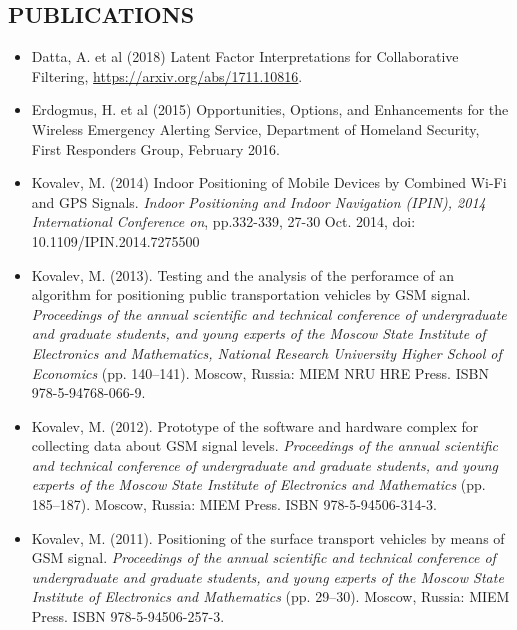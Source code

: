 \documentclass{res}
\begin{document}
\begin{resume}
\section{PUBLICATIONS}
\begin{itemize}
	\item
		Datta, A. et al (2018)  Latent Factor Interpretations for Collaborative Filtering, \url{https://arxiv.org/abs/1711.10816}.
	\item
		Erdogmus, H. et al (2015) Opportunities, Options, and Enhancements for the Wireless Emergency Alerting Service, Department of Homeland Security, First Responders Group, February 2016.  
	\item
		Kovalev, M. (2014) Indoor Positioning of Mobile Devices by Combined Wi-Fi and GPS Signals. \emph{Indoor Positioning and Indoor Navigation (IPIN), 2014 International Conference on}, pp.332-339, 27-30 Oct. 2014, doi: 10.1109/IPIN.2014.7275500
	\item
		Kovalev, M. (2013). Testing and the analysis of the perforamce of an algorithm for positioning public transportation vehicles by GSM signal. \emph{Proceedings of the annual scientific and technical conference of undergraduate and graduate students, and young experts of the Moscow State Institute of Electronics and Mathematics, National Research University Higher School of Economics} (pp. 140--141). Moscow, Russia: MIEM NRU HRE Press. ISBN 978-5-94768-066-9.\\

	\item
		Kovalev, M. (2012). Prototype of the software and hardware complex for collecting data about GSM signal levels. \emph{Proceedings of the annual scientific and technical conference of undergraduate and graduate students, and young experts of the Moscow State Institute of Electronics and Mathematics} (pp. 185--187). Moscow, Russia: MIEM Press. ISBN 978-5-94506-314-3.\\
		
	\item
		Kovalev, M. (2011). Positioning of the surface transport vehicles by means of GSM signal. \emph{Proceedings of the annual scientific and technical conference of undergraduate and graduate students, and young experts of the Moscow State Institute of Electronics and Mathematics} (pp. 29--30). Moscow, Russia: MIEM Press. ISBN 978-5-94506-257-3.\\
	
\end{itemize}


\end{resume}
\end{document}
